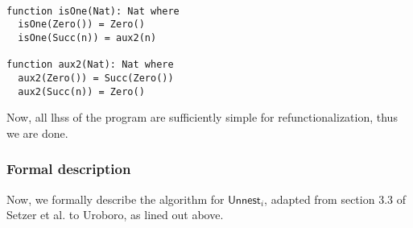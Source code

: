 \begin{lstlisting}

function isOne(Nat): Nat where
  isOne(Zero()) = Zero()
  isOne(Succ(n)) = aux2(n)

function aux2(Nat): Nat where
  aux2(Zero()) = Succ(Zero())
  aux2(Succ(n)) = Zero()

\end{lstlisting}

Now, all lhss of the program are sufficiently simple for refunctionalization, thus we are done.

\subsubsection{Formal description}

Now, we formally describe the algorithm for $\textsf{Unnest}_i$, adapted from section 3.3 of Setzer et al.\cite{setzer14unnesting} to Uroboro, as lined out above.

